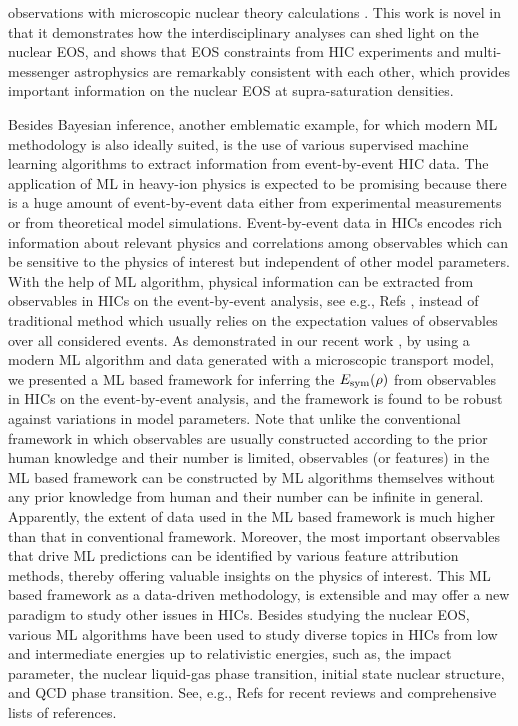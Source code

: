 \documentclass[twocolumn,aps,superscriptaddress]{revtex4}
\begin{document}
observations with microscopic nuclear theory calculations \cite{huth2022constraining}. This work is novel in that it demonstrates how the interdisciplinary analyses can shed light on the nuclear EOS, and shows that EOS constraints from
HIC experiments and multi-messenger astrophysics are remarkably consistent with each other, which provides important information on the nuclear EOS at supra-saturation densities.

Besides Bayesian inference, another emblematic example, for which modern ML methodology is also ideally suited, is the use of various supervised machine learning algorithms to extract information from event-by-event HIC data. The application of ML in heavy-ion physics is expected to be promising because there is a huge amount of event-by-event data either from experimental measurements or from theoretical model simulations. Event-by-event data in HICs encodes rich information about relevant physics and correlations
among observables which can be sensitive to the physics of interest but independent of other model parameters. With the help of ML algorithm, physical information can be extracted from observables in HICs
on the event-by-event analysis, see e.g., Refs \cite{pang2018equation,wang2022decoding}, instead of traditional method which usually relies on the expectation values
of observables over all considered events. As demonstrated in our recent work \cite{wang2022decoding}, by using a modern ML algorithm and data generated with a microscopic transport model, we presented a ML based framework for inferring the
$E_{\rm sym}(\rho)$ from observables in HICs on the event-by-event analysis, and the
framework is found to be robust against variations in model parameters. Note that unlike the conventional framework in which observables are usually constructed according to the prior human knowledge and their number is limited, observables (or features) in the ML based framework can be constructed by ML algorithms themselves without any prior knowledge from human and their number can be infinite in general. Apparently, the extent of data used in the ML based framework is much higher than that in conventional framework.
Moreover, the most important observables that drive ML predictions can be identified by various feature attribution methods, thereby offering valuable insights on the physics of interest. This ML based framework as a data-driven methodology, is extensible and may offer a new paradigm to study other issues in HICs.
Besides studying the nuclear EOS, various ML algorithms have been used to study diverse topics in HICs from low and intermediate energies up to relativistic energies, such as, the impact parameter, the nuclear liquid-gas phase transition, initial state nuclear structure, and QCD phase transition. See, e.g., Refs \cite{boehnlein2022colloquium,he2023high,he2023machine,zhou2023} for recent reviews and comprehensive lists of references.
\end{document}
